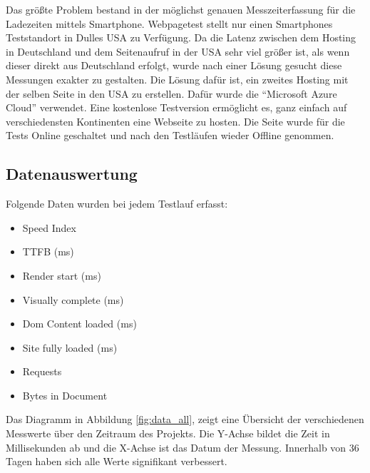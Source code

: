 		Das größte Problem bestand in der möglichst genauen Messzeiterfassung für die Ladezeiten mittels Smartphone. Webpagetest stellt nur einen Smartphones Teststandort in Dulles USA zu Verfügung. Da die Latenz zwischen dem Hosting in Deutschland und dem Seitenaufruf in der USA sehr viel größer ist, als wenn dieser direkt aus Deutschland erfolgt, wurde nach einer Lösung gesucht diese Messungen exakter zu gestalten.
		Die Lösung dafür ist, ein zweites Hosting mit der selben Seite in den USA zu erstellen. Dafür wurde die "`Microsoft Azure Cloud"' verwendet. Eine kostenlose Testversion ermöglicht es, ganz einfach auf verschiedensten Kontinenten eine Webseite zu hosten. Die Seite wurde für die Tests Online geschaltet und nach den Testläufen wieder Offline genommen.


	\subsection{Datenauswertung}
	\label{sub:datenauswertung}
		Folgende Daten wurden bei jedem Testlauf erfasst:

		\begin{itemize}
			\item Speed Index
			\item TTFB (ms)
			\item Render start (ms)
			\item Visually complete (ms)
			\item Dom Content loaded (ms)
			\item Site fully loaded (ms)
			\item Requests
			\item Bytes in Document
		\end{itemize}

        Das Diagramm in Abbildung \ref{fig:data_all}, zeigt eine Übersicht der verschiedenen Messwerte über den Zeitraum des Projekts. Die Y-Achse bildet die Zeit in Millisekunden ab und die X-Achse ist das Datum der Messung. Innerhalb von 36 Tagen haben sich alle Werte signifikant verbessert.

